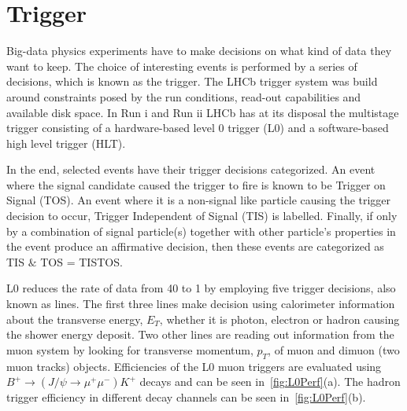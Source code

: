\section{Trigger }
\label{triggerchap}
Big-data physics experiments have to make decisions on what kind of data they want to keep. The choice of interesting events is performed by a series of decisions, which is known as the trigger. The \Gls{LHCb} trigger system was build around constraints posed by the run conditions, read-out capabilities and available disk space. In Run \Rn{1} and Run \Rn{2} \gls{LHCb} has at its disposal the multistage trigger consisting of a hardware-based level 0 trigger (\Gls{L0}) and a software-based high level trigger (\Gls{HLT}).

In the end, selected events have their trigger decisions categorized. An event where the signal candidate caused the trigger to fire is known to be Trigger on Signal (\Gls{TOS}). An event where it is a non-signal like particle causing the trigger decision to occur, Trigger Independent of Signal (\Gls{TIS}) is labelled. Finally, if only by a combination of signal particle(s) together with other particle's properties in the event produce an affirmative decision, then these events are categorized as \Gls{TIS} $\&$ \Gls{TOS} = \Gls{TISTOS}.

\Gls{L0} reduces the rate of data from 40 \mhz to 1 \mhz by employing five trigger decisions, also known as lines. The first three lines make decision using calorimeter information about the transverse energy, $E_{T}$, whether it is photon, electron or hadron causing the shower energy deposit. Two other lines are reading out information from the muon system by looking for transverse momentum, $p_{T}$, of muon and dimuon (two muon tracks) objects. Efficiencies of the L0 muon triggers are evaluated using $B^{+} \rightarrow (J/\psi \rightarrow \mu^{+} \mu^{-}) K^{+}$ decays and can be seen in~\autoref{fig:L0Perf}(a). The hadron trigger efficiency in different decay channels can be seen in~\autoref{fig:L0Perf}(b). 


